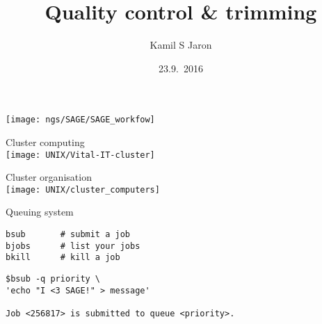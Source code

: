 \documentclass[xcolor=dvipsnames]{beamer}
\title[ ]{Quality control \& trimming}
\author{Kamil S Jaron}
\date{23.9.~2016}
\begin{document}
\LARGE

\begin{frame}
	\titlepage
\end{frame}

\begin{frame}
	\begin{center}
		\texttt{[image: ngs/SAGE/SAGE\_workfow]}
	\end{center}
\end{frame}

\begin{frame}
	\begin{center}
		\Huge
		Cluster computing\\
		\vspace{1cm}
		\texttt{[image: UNIX/Vital-IT-cluster]}
	\end{center}
\end{frame}

\begin{frame}
	\begin{center}
		\Huge
		Cluster organisation\\
		\vspace{1cm}
		\texttt{[image: UNIX/cluster\_computers]}
	\end{center}
\end{frame}

\begin{frame}
	\begin{center}
		\Huge
		Queuing system\\
		\vspace{1cm}

	\end{center}
\end{frame}

\begin{frame}[fragile]
\huge
\begin{verbatim}
bsub       # submit a job
bjobs      # list your jobs
bkill      # kill a job
\end{verbatim}
\end{frame}

\begin{frame}[fragile]
\large
\begin{verbatim}
$bsub -q priority \
'echo "I <3 SAGE!" > message'

Job <256817> is submitted to queue <priority>.
\end{verbatim}
\end{frame}
\end{document}

